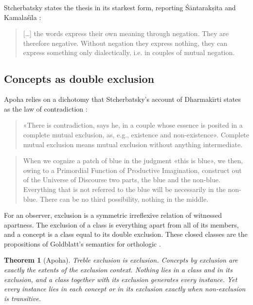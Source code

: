 \documentclass[11pt]{article}
\theoremstyle{plain}
\newtheorem{theorem}{Theorem}[section]
\theoremstyle{definition}
\begin{document}
\noindent Stcherbatsky states the thesis in its starkest form, reporting Śāntarakṣita and
Kamalaśīla \cite[p.~471]{Stcherbatsky1932}:

\begin{quote}
[\ldots] the words express their own meaning through negation. They are therefore negative.
Without negation they express nothing, they can express something only dialectically, i.e.
in couples of mutual negation.
\end{quote}

\subsection{Concepts as double exclusion}

Apoha relies on a dichotomy that Stcherbatsky's account of Dharmakīrti states as the law of
contradiction \cite[pp.~403 and 417]{Stcherbatsky1932}:

\begin{quote}
«There is contradiction, says he, in a couple whose essence is posited in a complete mutual
exclusion, as, e.g., existence and non-existence». Complete mutual exclusion means mutual
exclusion without anything intermediate.
\end{quote}

\begin{quote}
When we cognize a patch of blue in the judgment «this is blue», we then, owing to a Primordial
Function of Productive Imagination, construct out of the Universe of Discourse two parts, the
blue and the non-blue. Everything that is not referred to the blue will be necessarily in the
non-blue. There can be no third possibility, nothing in the middle.
\end{quote}

\noindent For an observer, exclusion is a symmetric irreflexive relation of witnessed
apartness. The exclusion of a class is everything apart from all of its members, and a
concept is a class equal to its double exclusion. These closed classes are the propositions
of Goldblatt's semantics for orthologic \cite{Goldblatt1974}.

\begin{theorem}[Apoha]
Treble exclusion is exclusion. Concepts by exclusion are exactly the extents of the exclusion
context. Nothing lies in a class and in its exclusion, and a class together with its exclusion
generates every instance. Yet every instance lies in each concept or in its exclusion exactly
when non-exclusion is transitive.
\end{theorem}
\end{document}
